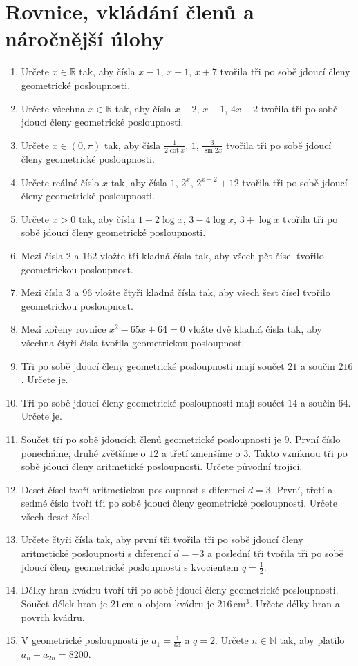 \documentclass[12pt,a4paper]{article}
\begin{document}
\section*{Rovnice, vkládání členů a náročnější úlohy}
\begin{enumerate}[label=\arabic*.,start=56]
    \item Určete $x\in\mathbb R$ tak, aby čísla $x-1$, $x+1$, $x+7$ tvořila tři po sobě jdoucí členy geometrické posloupnosti.
    \item Určete všechna $x\in\mathbb R$ tak, aby čísla $x-2$, $x+1$, $4x-2$ tvořila tři po sobě jdoucí členy geometrické posloupnosti.
    \item Určete $x\in(0,\pi)$ tak, aby čísla $\frac{1}{2\cot x}$, $1$, $\frac{3}{\sin2x}$ tvořila tři po sobě jdoucí členy geometrické posloupnosti.
    \item Určete reálné číslo $x$ tak, aby čísla $1$, $2^x$, $2^{x+2}+12$ tvořila tři po sobě jdoucí členy geometrické posloupnosti.
    \item Určete $x>0$ tak, aby čísla $1+2\log x$, $3-4\log x$, $3+\log x$ tvořila tři po sobě jdoucí členy geometrické posloupnosti.
    \item Mezi čísla $2$ a $162$ vložte tři kladná čísla tak, aby všech pět čísel tvořilo geometrickou posloupnost.
    \item Mezi čísla $3$ a $96$ vložte čtyři kladná čísla tak, aby všech šest čísel tvořilo geometrickou posloupnost.
    \item Mezi kořeny rovnice $x^2-65x+64=0$ vložte dvě kladná čísla tak, aby všechna čtyři čísla tvořila geometrickou posloupnost.
    \item Tři po sobě jdoucí členy geometrické posloupnosti mají součet $21$ a součin $216$. Určete je.
    \item Tři po sobě jdoucí členy geometrické posloupnosti mají součet $14$ a součin $64$. Určete je.
    \item Součet tří po sobě jdoucích členů geometrické posloupnosti je $9$. První číslo ponecháme, druhé zvětšíme o $12$ a třetí zmenšíme o $3$. Takto vzniknou tři po sobě jdoucí členy aritmetické posloupnosti. Určete původní trojici.
    \item Deset čísel tvoří aritmetickou posloupnost s diferencí $d=3$. První, třetí a sedmé číslo tvoří tři po sobě jdoucí členy geometrické posloupnosti. Určete všech deset čísel.
    \item Určete čtyři čísla tak, aby první tři tvořila tři po sobě jdoucí členy aritmetické posloupnosti s diferencí $d=-3$ a poslední tři tvořila tři po sobě jdoucí členy geometrické posloupnosti s kvocientem $q=\frac12$.
    \item Délky hran kvádru tvoří tři po sobě jdoucí členy geometrické posloupnosti. Součet délek hran je $21\,\mathrm{cm}$ a objem kvádru je $216\,\mathrm{cm}^3$. Určete délky hran a povrch kvádru.
    \item V geometrické posloupnosti je $a_1=\frac1{64}$ a $q=2$. Určete $n\in\mathbb N$ tak, aby platilo $a_n+a_{2n}=8200$.
\end{enumerate}
\end{document}
